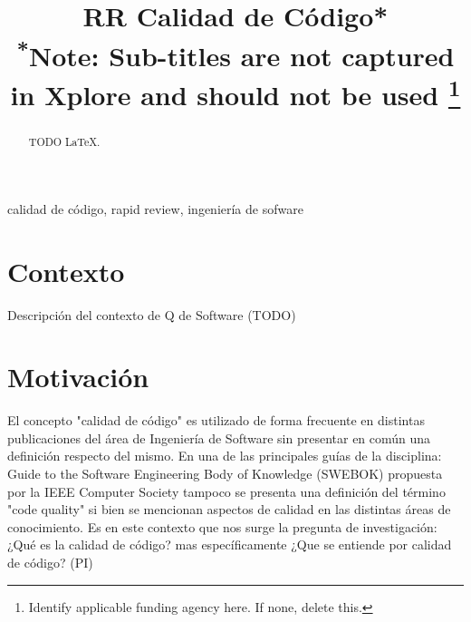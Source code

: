 \documentclass[conference]{IEEEtran}
\begin{document}
\title{RR Calidad de Código*\\
{\footnotesize \textsuperscript{*}Note: Sub-titles are not captured in Xplore and
should not be used}
\thanks{Identify applicable funding agency here. If none, delete this.}
}

\author{
\and
{}


}

\maketitle

\begin{abstract}
TODO \LaTeX.
\end{abstract}

\begin{IEEEkeywords}
calidad de código, rapid review, ingeniería de sofware
\end{IEEEkeywords}

\section{Contexto}


Descripción del contexto de Q de Software (TODO) 
\section{Motivación}

 El concepto "calidad de código" es utilizado de forma frecuente en distintas publicaciones del área de Ingeniería de Software \cite{stamelos2002code,spinellis2006code,butler2010exploring,baggen2012standardized, raychev2021learning,yang2021design} sin presentar en común una definición respecto del mismo.   En una de las principales guías de la disciplina:  Guide to the Software Engineering Body of Knowledge (SWEBOK) \cite{bourque1999guide} propuesta por la IEEE Computer Society  tampoco  se presenta una definición del término "code quality" si bien se mencionan aspectos de calidad en las distintas áreas de conocimiento. 
  Es en este contexto que nos surge la pregunta de investigación:  ¿Qué es la calidad de código?  mas específicamente ¿Que se entiende por calidad de código? (PI)
\end{document}
